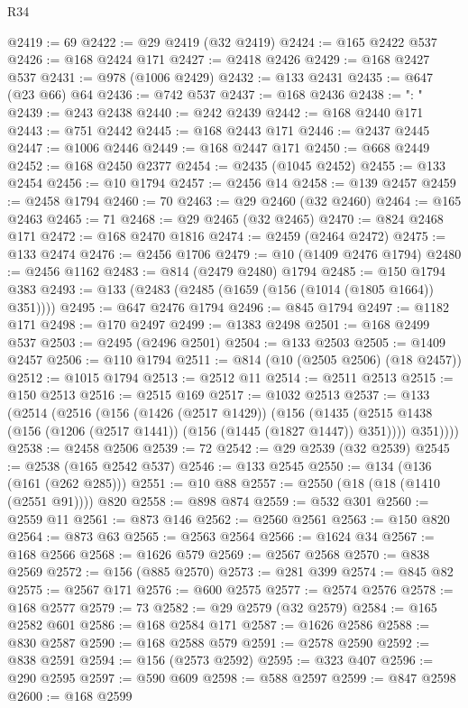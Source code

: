 \begin{lexlean}{R34}
\begin{coremodule}
@2419 := 69
@2422 := @29 @2419 (@32 @2419)
@2424 := @165 @2422 @537
@2426 := @168 @2424 @171
@2427 := @2418 @2426
@2429 := @168 @2427 @537
@2431 := @978 (@1006 @2429)
@2432 := @133 @2431
@2435 := @647 (@23 @66) @64
@2436 := @742 @537
@2437 := @168 @2436
@2438 := ": "
@2439 := @243 @2438
@2440 := @242 @2439
@2442 := @168 @2440 @171
@2443 := @751 @2442
@2445 := @168 @2443 @171
@2446 := @2437 @2445
@2447 := @1006 @2446
@2449 := @168 @2447 @171
@2450 := @668 @2449
@2452 := @168 @2450 @2377
@2454 := @2435 (@1045 @2452)
@2455 := @133 @2454
@2456 := @10 @1794
@2457 := @2456 @14
@2458 := @139 @2457
@2459 := @2458 @1794
@2460 := 70
@2463 := @29 @2460 (@32 @2460)
@2464 := @165 @2463
@2465 := 71
@2468 := @29 @2465 (@32 @2465)
@2470 := @824 @2468 @171
@2472 := @168 @2470 @1816
@2474 := @2459 (@2464 @2472)
@2475 := @133 @2474
@2476 := @2456 @1706
@2479 := @10 (@1409 @2476 @1794)
@2480 := @2456 @1162
@2483 := @814 (@2479 @2480) @1794
@2485 := @150 @1794 @383
@2493 := @133 (@2483 (@2485 (@1659 (@156 (@1014 (@1805 @1664)) @351))))
@2495 := @647 @2476 @1794
@2496 := @845 @1794
@2497 := @1182 @171
@2498 := @170 @2497
@2499 := @1383 @2498
@2501 := @168 @2499 @537
@2503 := @2495 (@2496 @2501)
@2504 := @133 @2503
@2505 := @1409 @2457
@2506 := @110 @1794
@2511 := @814 (@10 (@2505 @2506) (@18 @2457))
@2512 := @1015 @1794
@2513 := @2512 @11
@2514 := @2511 @2513
@2515 := @150 @2513
@2516 := @2515 @169
@2517 := @1032 @2513
@2537 := @133
    (@2514
      (@2516
        (@156
          (@1426 (@2517 @1429))
          (@156
            (@1435 (@2515 @1438 (@156 (@1206 (@2517 @1441)) (@156 (@1445 (@1827 @1447)) @351))))
            @351))))
@2538 := @2458 @2506
@2539 := 72
@2542 := @29 @2539 (@32 @2539)
@2545 := @2538 (@165 @2542 @537)
@2546 := @133 @2545
@2550 := @134 (@136 (@161 (@262 @285)))
@2551 := @10 @88
@2557 := @2550 (@18 (@18 (@1410 (@2551 @91)))) @820
@2558 := @898 @874
@2559 := @532 @301
@2560 := @2559 @11
@2561 := @873 @146
@2562 := @2560 @2561
@2563 := @150 @820
@2564 := @873 @63
@2565 := @2563 @2564
@2566 := @1624 @34
@2567 := @168 @2566
@2568 := @1626 @579
@2569 := @2567 @2568
@2570 := @838 @2569
@2572 := @156 (@885 @2570)
@2573 := @281 @399
@2574 := @845 @82
@2575 := @2567 @171
@2576 := @600 @2575
@2577 := @2574 @2576
@2578 := @168 @2577
@2579 := 73
@2582 := @29 @2579 (@32 @2579)
@2584 := @165 @2582 @601
@2586 := @168 @2584 @171
@2587 := @1626 @2586
@2588 := @830 @2587
@2590 := @168 @2588 @579
@2591 := @2578 @2590
@2592 := @838 @2591
@2594 := @156 (@2573 @2592)
@2595 := @323 @407
@2596 := @290 @2595
@2597 := @590 @609
@2598 := @588 @2597
@2599 := @847 @2598
@2600 := @168 @2599

\end{coremodule}
\end{lexlean}
